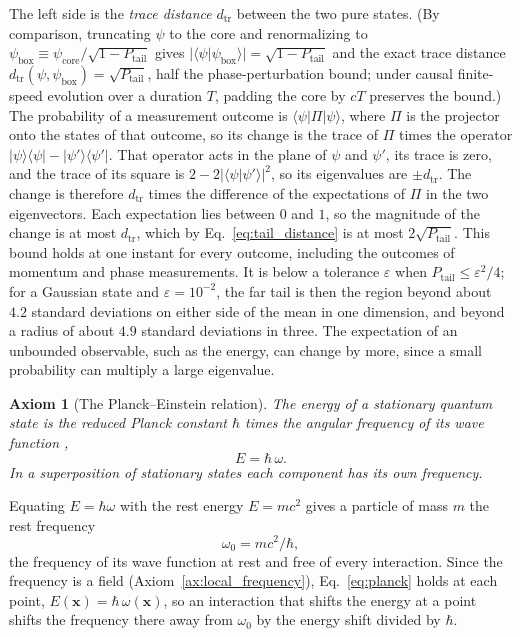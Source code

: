 \documentclass[aps,prd,onecolumn,tightenlines,nofootinbib,notitlepage,11pt,floatfix]{revtex4-2}
\theoremstyle{indentedtheorem}
\newtheorem{axiom}{Axiom}
\begin{document}
The left side is the \emph{trace distance} $d_\text{tr}$ between the two pure states. (By comparison, truncating $\psi$ to the core and renormalizing to $\psi_\text{box}\equiv\psi_\text{core}/\sqrt{1-P_\text{tail}}$ gives $|\langle\psi|\psi_\text{box}\rangle|=\sqrt{1-P_\text{tail}}$ and the exact trace distance $d_\text{tr}(\psi,\psi_\text{box})=\sqrt{P_\text{tail}}$, half the phase-perturbation bound; under causal finite-speed evolution over a duration $T$, padding the core by $cT$ preserves the bound.) The probability of a measurement outcome is $\langle\psi|\Pi|\psi\rangle$, where $\Pi$ is the projector onto the states of that outcome, so its change is the trace of $\Pi$ times the operator $|\psi\rangle\langle\psi|-|\psi'\rangle\langle\psi'|$. That operator acts in the plane of $\psi$ and $\psi'$, its trace is zero, and the trace of its square is $2-2|\langle\psi|\psi'\rangle|^2$, so its eigenvalues are $\pm d_\text{tr}$. The change is therefore $d_\text{tr}$ times the difference of the expectations of $\Pi$ in the two eigenvectors. Each expectation lies between $0$ and $1$, so the magnitude of the change is at most $d_\text{tr}$, which by Eq.~\eqref{eq:tail_distance} is at most $2\sqrt{P_\text{tail}}$. This bound holds at one instant for every outcome, including the outcomes of momentum and phase measurements. It is below a tolerance $\varepsilon$ when $P_\text{tail}\le\varepsilon^2/4$; for a Gaussian state and $\varepsilon=10^{-2}$, the far tail is then the region beyond about $4.2$ standard deviations on either side of the mean in one dimension, and beyond a radius of about $4.9$ standard deviations in three. The expectation of an unbounded observable, such as the energy, can change by more, since a small probability can multiply a large eigenvalue.

\begin{axiom}[The Planck--Einstein relation]\label{ax:planck}
The energy of a stationary quantum state is the reduced Planck constant $\hbar$ times the angular frequency of its wave function \citep{Planck1901Radiation,Einstein1905Photoelectric},
\begin{equation}
    E = \hbar \, \omega .
    \label{eq:planck}
\end{equation}
In a superposition of stationary states each component has its own frequency.
\end{axiom}

Equating $E=\hbar\omega$ with the rest energy $E=mc^2$ \citep{Einstein1905Inertia} gives a particle of mass $m$ the rest frequency
\begin{equation}
    \omega_0 = mc^2/\hbar ,
    \label{eq:rest_freq}
\end{equation}
the frequency of its wave function at rest and free of every interaction. Since the frequency is a field (Axiom~\ref{ax:local_frequency}), Eq.~\eqref{eq:planck} holds at each point, $E(\mathbf{x})=\hbar\,\omega(\mathbf{x})$, so an interaction that shifts the energy at a point shifts the frequency there away from $\omega_0$ by the energy shift divided by $\hbar$.
\end{document}
